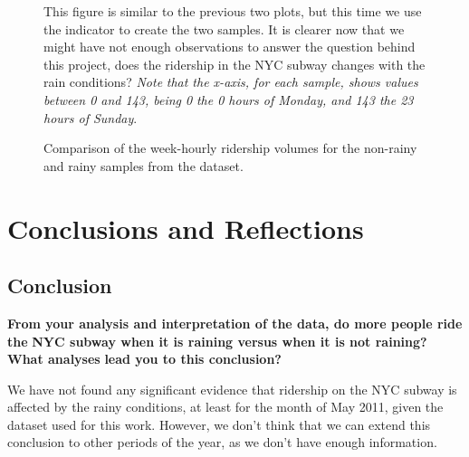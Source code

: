 \documentclass[a4paper,12pt,english]{sphinxmanual}
\begin{document}
\begin{figure}[htbp]
\centering
\capstart

\caption{Comparison of the week-hourly ridership volumes for the non-rainy and rainy
samples from the  dataset.}{\small 
This figure is similar to the previous two plots, but this time we use the
 indicator to create the two samples. It is clearer now that we
might have not enough observations to answer the question behind this project,
does the ridership in the NYC subway changes with the rain conditions? \emph{Note}
\emph{that the x-axis, for each sample, shows values between 0 and 143, being 0}
\emph{the 0 hours of Monday, and 143 the 23 hours of Sunday}.
}\label{section3:figure47}\end{figure}


\chapter{Conclusions and Reflections}
\label{section4::doc}\label{section4:conclusions-and-reflections}

\section{Conclusion}
\label{section4:conclusion}
\textbf{From your analysis and interpretation of the data, do more people ride the}
\textbf{NYC subway when it is raining versus when it is not raining?  What analyses}
\textbf{lead you to this conclusion?}

We have not found any significant evidence that ridership on the NYC subway is
affected by the rainy conditions, at least for the month of May 2011, given the
dataset used for this work. However, we don't think that we can extend this
conclusion to other periods of the year, as we don't have enough information.
\end{document}
